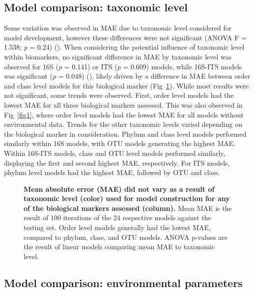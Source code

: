 \documentclass[
  10pt,
  letterpaper,
]{article}
\begin{document}
\subsection{Model comparison: taxonomic
level}\label{model-comparison-taxonomic-level}

Some variation was observed in MAE due to taxonomic level considered for
model development, however these differences were not significant (ANOVA
F = 1.538; \emph{p} = 0.24) (). When considering the
potential influence of taxonomic level within biomarkers, no significant
difference in MAE by taxonomic level was observed for 16S (\emph{p} =
0.141) or ITS (\emph{p} = 0.609) models, while 16S-ITS models was
significant (\emph{p} = 0.048) (), likely driven by a
difference in MAE between order and class level models for this
biological marker (Fig~\ref{fig4}). While most results were not
significant, some trends were observed. First, order level models had
the lowest MAE for all three biological markers assessed. This was also
observed in Fig~\ref{fig1}, where order level models had the lowest MAE
for all models without environmental data. Trends for the other
taxonomic levels varied depending on the biological marker in
consideration. Phylum and class level models performed similarly within
16S models, with OTU models generating the highest MAE. Within 16S-ITS
models, class and OTU level models performed similarly, displaying the
first and second highest MAE, respectively. For ITS models, phylum level
models had the highest MAE, followed by OTU and class.

\begin{figure}[!h]
\caption{{\bf Mean absolute error (MAE) did not vary as a result of taxonomic level (color) used for model construction for any of the biological markers assessed (column).}
Mean MAE is the result of 100 iterations of the 24 respective models against the testing set. Order level models generally had the lowest MAE, compared to phylum, class, and OTU models. ANOVA p-values are the result of linear models comparing mean MAE to taxonomic level.}
\label{fig4}
\end{figure}

\subsection{Model comparison: environmental
parameters}\label{model-comparison-environmental-parameters}
\end{document}
